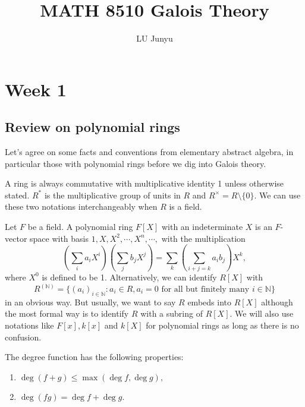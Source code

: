 \documentclass[12pt]{report}
\theoremstyle{definition}
\def\NN{\mathbb{N}}
\begin{document}
\title{MATH 8510 Galois Theory}
\author{LU Junyu}
\date{\vspace{-5ex}}


\maketitle
\chapter*{Week 1}
\setcounter{chapter}{1}
\section{Review on polynomial rings}

Let's agree on some facts and conventions from elementary abstract algebra, in particular those with polynomial rings before we dig into Galois theory.

\smallskip

A ring is always commutative with multiplicative identity 1 unless otherwise stated. $R^*$ is the multiplicative group of units in $R$ and $R^\times = R\setminus \{0\}$. We can use these two notations interchangeably when $R$ is a field.

\smallskip

Let $F$ be a field. A polynomial ring $F[X]$ with an indeterminate $X$ is an $F$-vector space with basis $1,X,X^2,\cdots,X^n,\cdots,$ with the multiplication $$(\sum_i a_iX^i)(\sum_j b_j X^j) =  \sum_k (\sum_{i+j=k}a_ib_j)X^k,$$ where $X^0$ is defined to be 1. Alternatively, we can identify $R[X]$ with $$R^{(\NN)}=\{(a_i)_{i\in\NN}: a_i\in R, a_i=0 \mbox{ for all but finitely many }i\in\NN\}$$ in an obvious way. But usually, we want to say $R$ embeds into $R[X]$ although the most formal way is to identify $R$ with a subring of $R[X]$.  We will also use notations like $F[x], k[x]$ and $k[X]$ for polynomial rings as long as there is no confusion.

The degree function has the following properties:
\begin{enumerate}
    \item $\deg(f+g) \leq \max(\deg f,\deg g),$
    \item $\deg(fg)=\deg f+\deg g.$
\end{enumerate}
\end{document}
